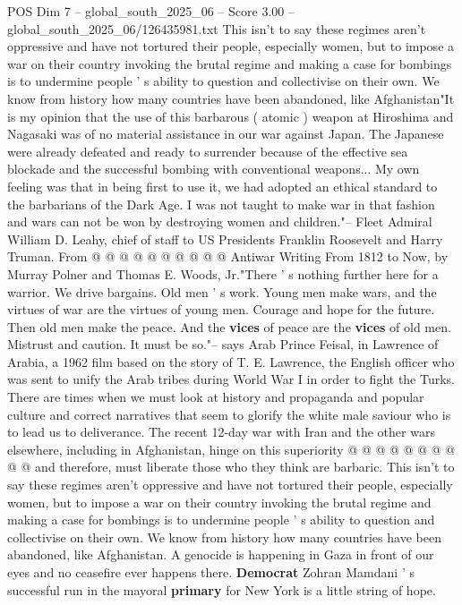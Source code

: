 \begin{textsample}{POS Dim 7 – global\_south\_2025\_06 – Score 3.00 – global\_south\_2025\_06/126435981.txt}  \label{ex:f7_pos_405}
This isn't to say these regimes aren't oppressive and have not tortured their people, especially women, but to impose a war on their country invoking the brutal regime and making a case for bombings is to undermine people ' s ability to question and collectivise on their own.
We know from history how many countries have been abandoned, like Afghanistan"It is my opinion that the use of this barbarous ( atomic ) weapon at Hiroshima and Nagasaki was of no material assistance in our war against Japan.
The Japanese were already defeated and ready to surrender because of the effective sea blockade and the successful bombing with conventional weapons...
My own feeling was that in being first to use it, we had adopted an ethical standard to the barbarians of the Dark Age.
I was not taught to make war in that fashion and wars can not be won by destroying women and children."-- Fleet Admiral William D.
Leahy, chief of staff to US Presidents Franklin Roosevelt and Harry Truman.
From @ @ @ @ @ @ @ @ @ @ Antiwar Writing From 1812 to Now, by Murray Polner and Thomas E.
Woods, Jr."There ' s nothing further here for a warrior.
We drive bargains.
Old men ' s work.
Young men make wars, and the virtues of war are the virtues of young men.
Courage and hope for the future.
Then old men make the peace.
And the \textbf{vices} of peace are the \textbf{vices} of old men.
Mistrust and caution.
It must be so."-- says Arab Prince Feisal, in Lawrence of Arabia, a 1962 film based on the story of T.
E.
Lawrence, the English officer who was sent to unify the Arab tribes during World War I in order to fight the Turks.
There are times when we must look at history and propaganda and popular culture and correct narratives that seem to glorify the white male saviour who is to lead us to deliverance.
The recent 12-day war with Iran and the other wars elsewhere, including in Afghanistan, hinge on this superiority @ @ @ @ @ @ @ @ @ @ and therefore, must liberate those who they think are barbaric.
This isn't to say these regimes aren't oppressive and have not tortured their people, especially women, but to impose a war on their country invoking the brutal regime and making a case for bombings is to undermine people ' s ability to question and collectivise on their own.
We know from history how many countries have been abandoned, like Afghanistan.
A genocide is happening in Gaza in front of our eyes and no ceasefire ever happens there. \textbf{Democrat} Zohran Mamdani ' s successful run in the mayoral \textbf{primary} for New York is a little string of hope.

\end{textsample}
